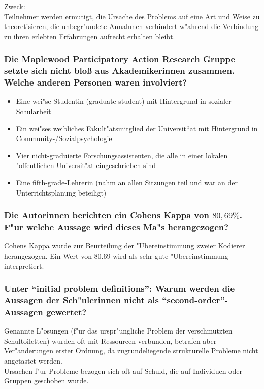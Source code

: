 \noindent Zweck:\\
Teilnehmer werden ermutigt, die Ursache des Problems auf eine Art und Weise zu theoretisieren, die unbegr"undete Annahmen verhindert w"ahrend die Verbindung zu ihren erlebten Erfahrungen aufrecht erhalten bleibt. 

\subsubsection{Die Maplewood Participatory Action Research Gruppe setzte sich nicht bloß aus Akademikerinnen zusammen. Welche anderen Personen waren involviert?}
\begin{itemize}
        \item Eine wei"se Studentin (graduate student) mit Hintergrund in sozialer Schularbeit
        \item Ein wei"ses weibliches Fakult"atsmitglied der  Universit“at mit Hintergrund in Community-/Sozialpsychologie
        \item Vier nicht-graduierte Forschungsassistenten, die alle in einer lokalen "offentlichen Universit"at eingeschrieben sind
        \item Eine fifth-grade-Lehrerin (nahm an allen Sitzungen teil und war an der Unterrichtsplanung beteiligt)
\end{itemize}

\subsubsection{Die Autorinnen berichten ein Cohens Kappa von $80,69\%$. F"ur welche Aussage wird dieses Ma"s herangezogen?}
Cohens Kappa wurde zur Beurteilung der "Ubereinstimmung zweier Kodierer herangezogen. Ein Wert von 80.69 wird als sehr gute "Ubereinstimmung interpretiert.

\subsubsection{Unter ``initial problem definitions'': Warum werden die Aussagen der Sch"ulerinnen nicht als ``second-order''-Aussagen gewertet?}
Genannte L"osungen (f"ur das urspr"ungliche Problem der verschmutzten Schultoiletten) wurden oft mit Ressourcen verbunden, betrafen aber Ver"anderungen erster Ordnung, da zugrundeliegende strukturelle Probleme nicht angetastet werden.\\
Ursachen f"ur Probleme bezogen sich oft auf Schuld, die auf Individuen oder Gruppen geschoben wurde.

